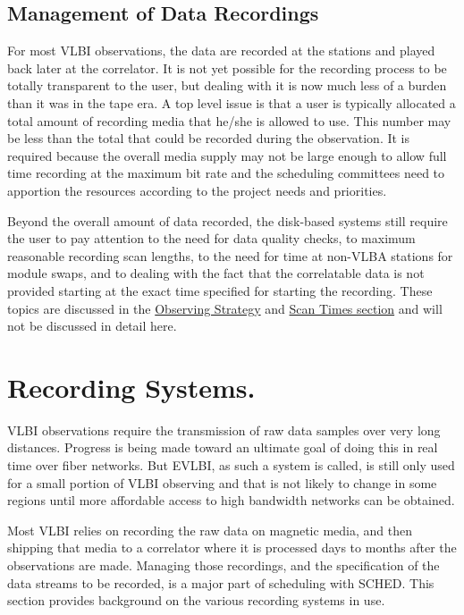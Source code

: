 \documentclass{report}
\newcommand{\sched}{{\sc SCHED}}
\begin{document}
\subsection{\label{SSEC:RECMANAGEMENT}Management of Data Recordings}

For most VLBI observations, the data are recorded at the stations and
played back later at the correlator.  It is not yet possible for the
recording process to be totally transparent to the user, but dealing
with it is now much less of a burden than it was in the tape era.
A top level issue is that a user is typically allocated a total amount
of recording media that he/she is allowed to use.  This number may
be less than the total that could be recorded during the observation.
It is required because the overall media supply may not be large
enough to allow full time recording at the maximum bit rate and the
scheduling committees need to apportion the resources according to
the project needs and priorities.

Beyond the overall amount of data recorded, the disk-based systems
still require the user to pay attention to the need for data quality
checks, to maximum reasonable recording scan lengths, to the need for
time at non-VLBA stations for module swaps, and to dealing with the
fact that the correlatable data is not provided starting at the exact
time specified for starting the recording.  These topics are discussed
in the 
{\hyperref[SSEC:STRATEGY]{Observing Strategy}} and 
{\hyperref[SSEC:SCANTIMES]{Scan Times section}}
and will not be discussed in detail here.

\section{\label{SEC:RECSYS}Recording Systems.}

VLBI observations require the transmission of raw data samples over 
very long distances.  Progress is being made toward an ultimate
goal of doing this in real time over fiber networks.  But EVLBI, as
such a system is called, is still only used for a small portion 
of VLBI observing and that is not likely to change in some regions
until more affordable access to high bandwidth networks can be obtained.

Most VLBI relies on recording the raw data on magnetic media, and then
shipping that media to a correlator where it is processed days to months
after the observations are made.  Managing those recordings, and the 
specification of the data streams to be recorded, is a major part of 
scheduling with \sched.  This section provides background on the
various recording systems in use.
\end{document}
